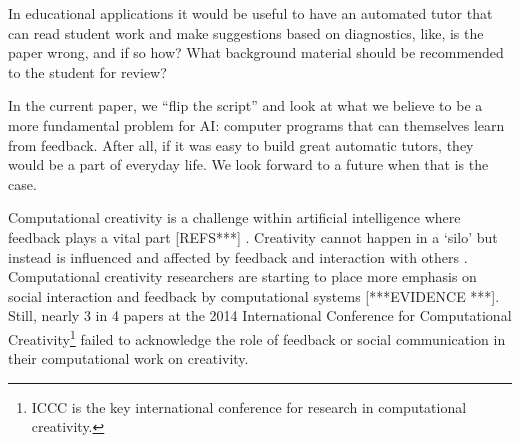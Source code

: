 %
%
%
%

%
%

In educational applications it would be useful to have an automated tutor that can read student work and make suggestions based on diagnostics, like, is the paper wrong, and if so how?  What background material should be recommended to the student for review?

In the current paper, we ``flip the script'' and look at what we believe to be a more fundamental problem for AI: computer programs that can themselves learn from feedback.  After all, if it was easy to build great automatic tutors, they would be a part of everyday life.  We look forward to a future when that is the case.

Computational creativity is a challenge within artificial intelligence where feedback plays a vital part [REFS***] \cite{perezyperez10MM,pease10}. Creativity cannot happen in a `silo' but instead is influenced and affected by feedback and interaction with others \cite{csik88,saunders2012towards}. Computational creativity researchers are starting to place more emphasis on social interaction and feedback by computational systems [***EVIDENCE ***]. Still, nearly 3 in 4 papers at the 2014 International Conference for Computational Creativity\footnote{ICCC is  the key international conference for research in computational creativity.} failed to acknowledge the role of feedback or social communication in their computational work on creativity. 

